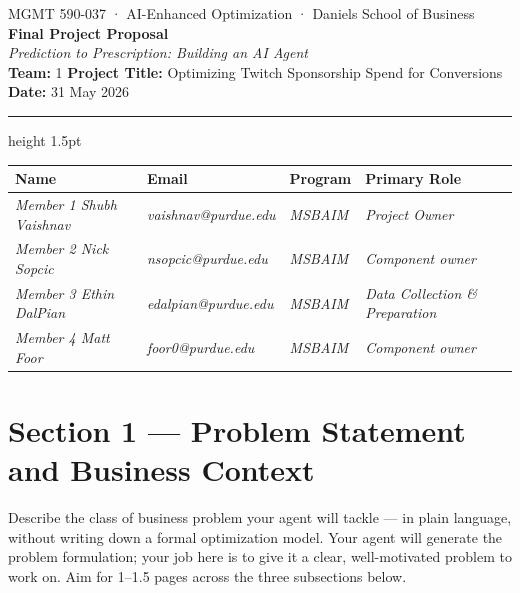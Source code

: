 \documentclass[11pt]{article}
\begin{document}
\begin{center}
  {\small\color{navyblue}
    MGMT 590-037 \;·\; AI-Enhanced Optimization \;·\; Daniels School of Business}\\[5pt]
  {\LARGE\bfseries\color{navyblue} Final Project Proposal}\\[4pt]
  {\large\itshape Prediction to Prescription: Building an AI Agent}\\[5pt]
  {\small
    \textbf{Team:} 1 \quad
    \textbf{Project Title:} Optimizing Twitch Sponsorship Spend for Conversions \quad
    \textbf{Date:} 31 May 2026}
\end{center}

\vspace{4pt}\hrule height 1.5pt\vspace{10pt}

\begin{center}
\small
\begin{tabular}{llll}
\toprule
\textbf{Name} & \textbf{Email} & \textbf{Program} & \textbf{Primary Role} \\
\midrule
\textit{Member 1 Shubh Vaishnav} & \textit{vaishnav@purdue.edu} & \textit{MSBAIM} & \textit{Project Owner} \\
\textit{Member 2 Nick Sopcic} & \textit{nsopcic@purdue.edu} & \textit{MSBAIM} & \textit{Component owner} \\
\textit{Member 3 Ethin DalPian} & \textit{edalpian@purdue.edu} & \textit{MSBAIM} & \textit {Data Collection \& Preparation} \\
\textit{Member 4 Matt Foor} & \textit{foor0@purdue.edu} & \textit{MSBAIM} & \textit{Component owner} \\
\bottomrule
\end{tabular}
\end{center}

\vspace{6pt}

\section{Section 1 — Problem Statement and Business Context}

\begin{hint}
  Describe the class of business problem your agent will tackle --- in plain
  language, without writing down a formal optimization model.
  Your agent will generate the problem formulation; your job here is to give
  it a clear, well-motivated problem to work on.
  Aim for 1--1.5 pages across the three subsections below.
\end{hint}
\end{document}
